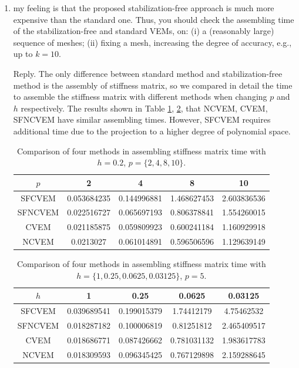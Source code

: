 \documentclass[10pt]{amsart}
\theoremstyle{definition}
\theoremstyle{remark}
\begin{document}
\begin{enumerate}[1.]
\item \textsf{
my feeling is that the proposed stabilization-free approach is much more
expensive than the standard one. Thus, you should check the assembling time
of the stabilization-free and standard VEMs, on: (i) a (reasonably large)
sequence of meshes; (ii) fixing a mesh, increasing the degree of accuracy,
e.g., up to $k = 10$.
}

\smallskip \noindent \textcolor[rgb]{1.00,0.00,0.00}{Reply.}
The only difference between standard method and stabilization-free method is the
assembly of stiffness matrix,
so we compared in detail the time to assemble the stiffness matrix with
different methods when changing $p$ and $h$ respectively. The results shown in Table
\ref{tab:ptime}, \ref{tab:ttime}, that
NCVEM, CVEM, SFNCVEM have similar assembling times. 
However, SFCVEM requires additional time due to the projection to a higher
degree of polynomial space.

\begin{table}[htbp]
\caption{Comparison of four methods in assembling stiffness matrix time with
 $h=0.2$, $p = \{2, 4, 8, 10\}$.}
\label{tab:ptime}
\centering
\begin{tabular}{c|cccc}
\toprule
$p$ & 2 & 4 & 8 & 10 \\
\hline
SFCVEM & 0.053684235 & 0.144996881 & 1.468627453 & 2.603836536 \\
SFNCVEM & 0.022516727 & 0.065697193 & 0.806378841 & 1.554260015 \\
CVEM & 0.021185875 & 0.059809923 & 0.600241184 & 1.160929918 \\
NCVEM & 0.0213027 & 0.061014891 & 0.596506596 & 1.129639149 \\
\bottomrule
\end{tabular}
\end{table}

\begin{table}[htbp]
\caption{Comparison of four methods in assembling stiffness matrix time with
 $h=\{1, 0.25, 0.0625, 0.03125\}$, $p = 5$.}
\label{tab:ttime}
\begin{tabular}{c|cccc}
\toprule
$h$ &    1	& 0.25 & 0.0625 & 0.03125\\
\hline
SFCVEM & 0.039689541 & 0.199015379	& 1.74412179	& 4.75462532\\
SFNCVEM & 0.018287182 & 0.100006819	& 0.81251812	& 2.465409517\\
CVEM & 0.018686771 & 0.087426662	& 0.781031132	& 1.983617783\\
NCVEM & 0.018309593 & 0.096345425	& 0.767129898	& 2.159288645\\
\bottomrule
\end{tabular}
\end{table}


\end{enumerate}
\end{document}

